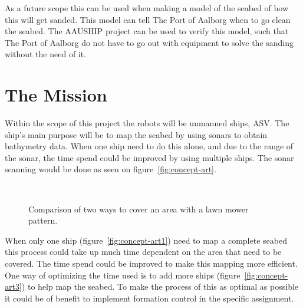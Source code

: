 As a future scope this can be used when making a model of the seabed of how this will get sanded. This model can tell The Port of Aalborg when to go clean the seabed. The AAUSHIP project can be used to verify this model, such that The Port of Aalborg do not have to go out with equipment to solve the sanding without the need of it.

\section{The Mission}
Within the scope of this project the robots will be unmanned ships,
\ac{ASV}. The ship's main purpose will be to map the seabed by using
sonars to obtain bathymetry data. When one ship need to do this alone, and due to the range of
the sonar, the time spend could be improved by using multiple ships. The sonar scanning would
be done as seen on figure~\vref{fig:concept-art}.

\begin{figure}[htbp]
	\centering
	\ %
	\caption{Comparison of two ways to cover an area with a lawn mower
	pattern.}
	\label{fig:concept-art}
\end{figure}

When only one ship (figure~\vref{fig:concept-art1}) need to map a complete seabed this process could
take up much time dependent on the area that need to be covered. The
time spend could be improved to make this mapping more efficient. One
way of optimizing the time used is to add more ships (figure~\vref{fig:concept-art3}) to help map the
seabed. To make the process of this as optimal as possible it could be
of benefit to implement formation control in the specific assignment.

